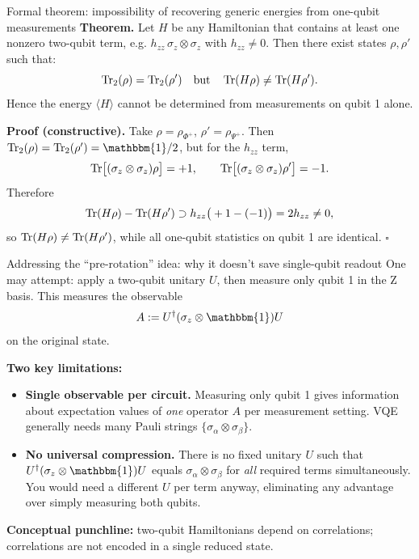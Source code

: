 \documentclass[aspectratio=169]{beamer}
\newcommand{\Z}{\sigma_z}
\newcommand{\I}{\mathbbm{1}}
\begin{document}
\begin{frame}{Formal theorem: impossibility of recovering generic energies from one-qubit measurements}
\textbf{Theorem.}
Let \(H\) be any Hamiltonian that contains at least one nonzero two-qubit term, e.g. \(h_{zz}\,\Z\otimes\Z\) with \(h_{zz}\neq 0\).
Then there exist states \(\rho,\rho'\) such that:
\[
\Tr_2(\rho)=\Tr_2(\rho')\quad\text{but}\quad \Tr(H\rho)\neq \Tr(H\rho').
\]
Hence the energy \(\langle H\rangle\) cannot be determined from measurements on qubit 1 alone.

\medskip
\textbf{Proof (constructive).}
Take \(\rho=\rho_{\Phi^+}\), \(\rho'=\rho_{\Psi^+}\). Then \(\Tr_2(\rho)=\Tr_2(\rho')=\I/2\),
but for the \(h_{zz}\) term,
\[
\Tr\!\big[(\Z\otimes\Z)\rho\big]=+1,\qquad \Tr\!\big[(\Z\otimes\Z)\rho'\big]=-1.
\]
Therefore
\[
\Tr(H\rho)-\Tr(H\rho') \supset h_{zz}\big(+1-(-1)\big)=2h_{zz}\neq 0,
\]
so \(\Tr(H\rho)\neq \Tr(H\rho')\), while all one-qubit statistics on qubit 1 are identical.
\(\square\)
\end{frame}

\begin{frame}{Addressing the ``pre-rotation'' idea: why it doesn't save single-qubit readout}
One may attempt: apply a two-qubit unitary \(U\), then measure only qubit 1 in the Z basis.
This measures the observable
\[
A := U^\dagger(\Z\otimes\I)U
\]
on the original state.

\medskip
\textbf{Two key limitations:}
\begin{itemize}
\item \textbf{Single observable per circuit.} Measuring only qubit 1 gives information about expectation values of \emph{one} operator \(A\) per measurement setting.
VQE generally needs many Pauli strings \(\{\sigma_\alpha\otimes\sigma_\beta\}\).
\item \textbf{No universal compression.} There is no fixed unitary \(U\) such that
\(U^\dagger(\Z\otimes\I)U\) equals \(\sigma_\alpha\otimes\sigma_\beta\) for \emph{all} required terms simultaneously.
You would need a different \(U\) per term anyway, eliminating any advantage over simply measuring both qubits.
\end{itemize}

\medskip
\textbf{Conceptual punchline:} two-qubit Hamiltonians depend on correlations; correlations are not encoded in a single reduced state.
\end{frame}
\end{document}
